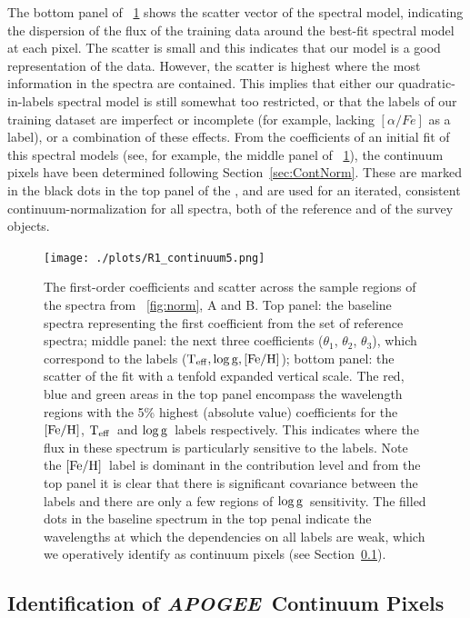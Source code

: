 \documentclass[12pt, preprint]{aastex}
\newcommand{\sectionname}{Section}
\newcommand{\apogee}{\textsl{APOGEE}}
\newcommand{\teff}{\mbox{$\rm T_{eff}$}}
\newcommand{\feh}{\mbox{$\rm [Fe/H]$}}
\newcommand{\logg}{\mbox{$\rm \log g$}}
\begin{document}
The bottom panel of \figurename~\ref{fig:coeffs} shows the scatter vector of the spectral model, 
indicating the dispersion of the flux of the training data around the best-fit spectral model at each pixel. 
The scatter is small and this indicates that our model is a good representation of the data. 
However, the scatter is highest where the most information in the spectra are contained. 
This implies that either our quadratic-in-labels spectral model is still somewhat too restricted, or that the labels of our training dataset are imperfect or incomplete 
(for example, lacking $[\alpha / Fe]$ as a label), or a combination of these effects. 
From the coefficients of an initial fit of this spectral models (see, for example, the middle panel of \figurename~\ref{fig:coeffs}), 
the continuum pixels have been determined following \sectionname~\ref{sec:ContNorm}. 
These are marked in the black dots in the top panel of the \figurename, and are used for an iterated, 
consistent continuum-normalization for all spectra, both of the reference and of the survey objects.

\begin{figure}[h!]
\centering
    \texttt{[image: ./plots/R1\_continuum5.png]}
  \caption{The first-order coefficients and scatter across the sample regions of the spectra from \figurename~\ref{fig:norm}, A and B. Top panel: the baseline spectra representing the first coefficient from the set of reference spectra; middle panel: the next three coefficients ($\theta_1$, $\theta_2$, $\theta_3$),  which correspond to the labels ($\teff, \logg, \feh$); bottom panel: the scatter of the fit with a tenfold expanded vertical scale.  The red, blue and green areas in the top panel encompass the wavelength regions with the 5\% highest (absolute value) coefficients for the \feh, \teff\ and \logg\ labels respectively. This indicates where the flux in these spectrum is particularly sensitive to the labels.  Note the \feh\ label is dominant in the contribution level and from the top panel it is clear that there is significant covariance between the labels and there are only a few regions of \logg\ sensitivity. The filled dots in the baseline spectrum in the top penal indicate the wavelengths at which the dependencies on all labels are weak, which we operatively identify as continuum pixels (see \sectionname~\ref{sec:ApogeeContinuum}).}
\label{fig:coeffs}
\end{figure}

\subsection{Identification of \apogee\ Continuum Pixels}
\label{sec:ApogeeContinuum}
\end{document}

